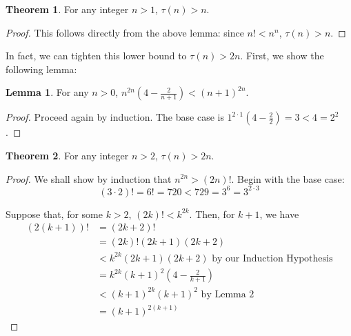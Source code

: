 \documentclass[a4paper]{article}
\theoremstyle{definition}
\newtheorem{theorem}{Theorem}
\newtheorem{lemma}{Lemma}
\begin{document}
\begin{theorem}
For any integer $n > 1$, $\tau(n) > n$. 
\end{theorem}

\begin{proof}
This follows directly from the above lemma: since $n!<n^n$, $\tau(n)>n$.
\end{proof}

In fact, we can tighten this lower bound to $\tau(n)>2n$. First, we show the following lemma:

\begin{lemma}
For any $n>0$, $n^{2n}\left(4-\frac{2}{n+1}\right)<(n+1)^{2n}$.
\end{lemma}

\begin{proof}
Proceed again by induction. The base case is $1^{2\cdot1}(4-\frac{2}{2})=3<4=2^2$. 
\end{proof}

\begin{theorem}
For any integer $n > 2$, $\tau(n)>2n$.
\end{theorem}

\begin{proof}
We shall show by induction that $n^{2n}>(2n)!$. Begin with the base case: \[(3\cdot2)!=6!=720<729=3^6=3^{2\cdot3}\]

Suppose that, for some $k>2$, $(2k)!<k^{2k}$. Then, for $k+1$, we have 
\begin{align*}
(2(k+1))!&=(2k+2)!\\
	 &=(2k)!(2k+1)(2k+2)\\
	 &<k^{2k}(2k+1)(2k+2)\text{ by our Induction Hypothesis}\\
	 &=k^{2k}(k+1)^2\left(4-\frac{2}{k+1}\right)\\
	 &<(k+1)^{2k}(k+1)^2\text{ by Lemma 2}\\
	 &=(k+1)^{2(k+1)}
\end{align*}
\end{proof}
\end{document}
